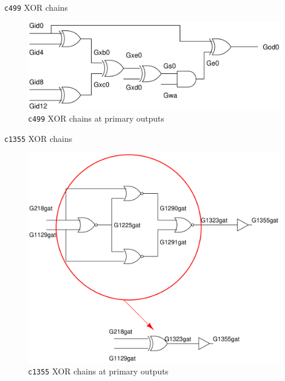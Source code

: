 \begin{frame}{\texttt{c499} XOR chains}
       \begin{figure}
                \begin{center}
                \label{fig:c499-c-l}
                \caption{\texttt{c499} XOR chains at primary outputs}
                        \includegraphics[scale=0.2]{fig/c499-xor-chains.pdf}
                \end{center}
        \end{figure}

\end{frame}

\begin{frame}{\texttt{c1355} XOR chains}
       \begin{figure}
                \begin{center}
                \label{fig:c1355-c-l}
                \caption{\texttt{c1355} XOR chains at primary outputs}
                        \includegraphics[scale=0.2]{fig/c1355-xor-chains.pdf}
                \end{center}
        \end{figure}

\end{frame}

